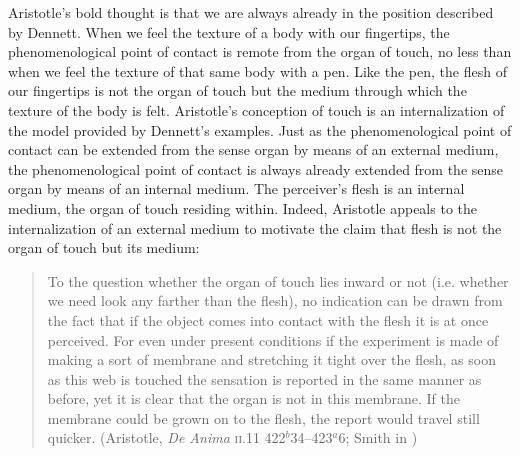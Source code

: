 Aristotle's bold thought is that we are always already in the position described by Dennett. When we feel the texture of a body with our fingertips, the phenomenological point of contact is remote from the organ of touch, no less than when we feel the texture of that same body with a pen. Like the pen, the flesh of our fingertips is not the organ of touch but the medium through which the texture of the body is felt. Aristotle's conception of touch is an internalization of the model provided by Dennett's examples. Just as the phenomenological point of contact can be extended from the sense organ by means of an external medium, the phenomenological point of contact is always already extended from the sense organ by means of an internal medium. The perceiver's flesh is an internal medium, the organ of touch residing within. Indeed, Aristotle appeals to the internalization of an external medium to motivate the claim that flesh is not the organ of touch but its medium:
\begin{quote}
    To the question whether the organ of touch lies inward or not (i.e. whether we need look any farther than the flesh), no indication can be drawn from the fact that if the object comes into contact with the flesh it is at once perceived. For even under present conditions if the experiment is made of making a sort of membrane and stretching it tight over the flesh, as soon as this web is touched the sensation is reported in the same manner as before, yet it is clear that the organ is not in this membrane. If the membrane could be grown on to the flesh, the report would travel still quicker. (Aristotle, \emph{De Anima} \textsc{ii}.11 422\( ^{b} \)34--423\( ^{a} \)6; Smith in \citealt{Barnes:1984uq})
\end{quote}

